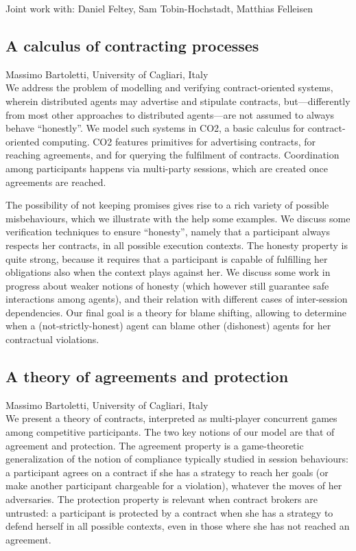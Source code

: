 \documentclass[11pt]{article}
\begin{document}
Joint work with: Daniel Feltey, Sam Tobin-Hochstadt, Matthias Felleisen

\subsection*{A calculus of contracting processes}
\noindent Massimo Bartoletti, University of Cagliari, Italy \\[0.5ex]

We address the problem of modelling and verifying contract-oriented
systems, wherein distributed agents may advertise and stipulate
contracts, but---differently from most other approaches to
distributed agents---are not assumed to always behave
``honestly''. We model such systems in CO2, a basic calculus for
contract-oriented computing. CO2 features primitives for advertising
contracts, for reaching agreements, and for querying the fulfilment of
contracts. Coordination among participants happens via multi-party
sessions, which are created once agreements are reached.

The possibility of not keeping promises gives rise to a rich variety
of possible misbehaviours, which we illustrate with the help some
examples.  We discuss some verification techniques to ensure
“honesty”, namely that a participant always respects her contracts,
in all possible execution contexts. The honesty property is quite
strong, because it requires that a participant is capable of
fulfilling her obligations also when the context plays against her. We
discuss some work in progress about weaker notions of honesty (which
however still guarantee safe interactions among agents), and their
relation with different cases of inter-session dependencies. Our final
goal is a theory for blame shifting, allowing to determine when a
(not-strictly-honest) agent can blame other (dishonest) agents for her
contractual violations.

\subsection*{A theory of agreements and protection}
\noindent Massimo Bartoletti, University of Cagliari, Italy \\[0.5ex]

We present a theory of contracts, interpreted as multi-player
concurrent games among competitive participants. The two key notions
of our model are that of agreement and protection. The agreement
property is a game-theoretic generalization of the notion of
compliance typically studied in session behaviours: a participant
agrees on a contract if she has a strategy to reach her goals (or make
another participant chargeable for a violation), whatever the moves of
her adversaries. The protection property is relevant when contract
brokers are untrusted: a participant is protected by a contract when
she has a strategy to defend herself in all possible contexts, even in
those where she has not reached an agreement.
\end{document}

